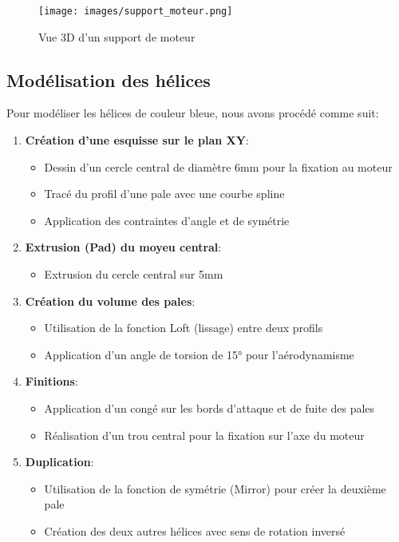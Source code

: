 \documentclass[a4paper,12pt]{report}
\begin{document}
\begin{figure}[H]
    \centering
    \texttt{[image: images/support\_moteur.png]}
    \caption{Vue 3D d'un support de moteur}
    \label{fig:support_moteur}
\end{figure}

\subsection{Modélisation des hélices}
Pour modéliser les hélices de couleur bleue, nous avons procédé comme suit:
\begin{enumerate}
    \item \textbf{Création d'une esquisse sur le plan XY}:
    \begin{itemize}
        \item Dessin d'un cercle central de diamètre 6mm pour la fixation au moteur
        \item Tracé du profil d'une pale avec une courbe spline
        \item Application des contraintes d'angle et de symétrie
    \end{itemize}
    
    \item \textbf{Extrusion (Pad) du moyeu central}:
    \begin{itemize}
        \item Extrusion du cercle central sur 5mm
    \end{itemize}
    
    \item \textbf{Création du volume des pales}:
    \begin{itemize}
        \item Utilisation de la fonction Loft (lissage) entre deux profils 
        \item Application d'un angle de torsion de 15° pour l'aérodynamisme
    \end{itemize}
    
    \item \textbf{Finitions}:
    \begin{itemize}
        \item Application d'un congé sur les bords d'attaque et de fuite des pales
        \item Réalisation d'un trou central pour la fixation sur l'axe du moteur
    \end{itemize}
    
    \item \textbf{Duplication}:
    \begin{itemize}
        \item Utilisation de la fonction de symétrie (Mirror) pour créer la deuxième pale
        \item Création des deux autres hélices avec sens de rotation inversé
    \end{itemize}
    

\end{enumerate}
\end{document}
